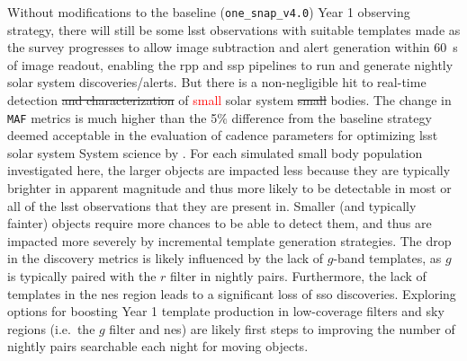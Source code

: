 \documentclass[preprintm,linenumbers]{aastex631}
\newcommand{\baseline}{\texttt{one\_snap\_v4.0}\xspace}
\newcommand{\maf}{\texttt{MAF}\xspace}
\providecommand{\red}[1]{\textcolor{red}{#1}}
\begin{document}
		Without modifications to the baseline (\baseline) Year 1 observing strategy, there will still be some \gls*{lsst} observations with suitable templates made as the survey progresses to allow image subtraction and alert generation within 60\ s of image readout, enabling the \gls*{rpp} and \gls*{ssp} pipelines to run and generate nightly solar system discoveries/alerts.
  But there is a non-negligible hit to real-time detection \sout{and characterization} of \red{small} solar system \sout{small} bodies. 
  The change in \maf metrics is much higher than the 5$\%$ difference from the baseline strategy deemed acceptable in the evaluation of cadence parameters for optimizing \gls*{lsst} solar system System science by \cite{schwambTuningLegacySurvey2023}. 
  For each simulated small body population investigated here, the larger objects are impacted less because they are typically brighter in apparent magnitude and thus more likely to be detectable in most or all of the \gls*{lsst} observations that they are present in. 
  Smaller (and typically fainter) objects require more chances to be able to detect them, and thus are impacted more severely by incremental template generation strategies. 
	The drop in the discovery metrics is likely influenced by the lack of $g$-band templates, as $g$ is typically paired with the $r$ filter in nightly pairs. 
  Furthermore, the lack of templates in the \gls*{nes} region leads to a significant loss of \gls*{sso} discoveries.
		Exploring options for boosting Year 1 template production in low-coverage filters and sky regions (i.e.\ the $g$ filter and \gls*{nes}) are likely first steps to improving the number of nightly pairs searchable each night for moving objects. 
		
\end{document}
